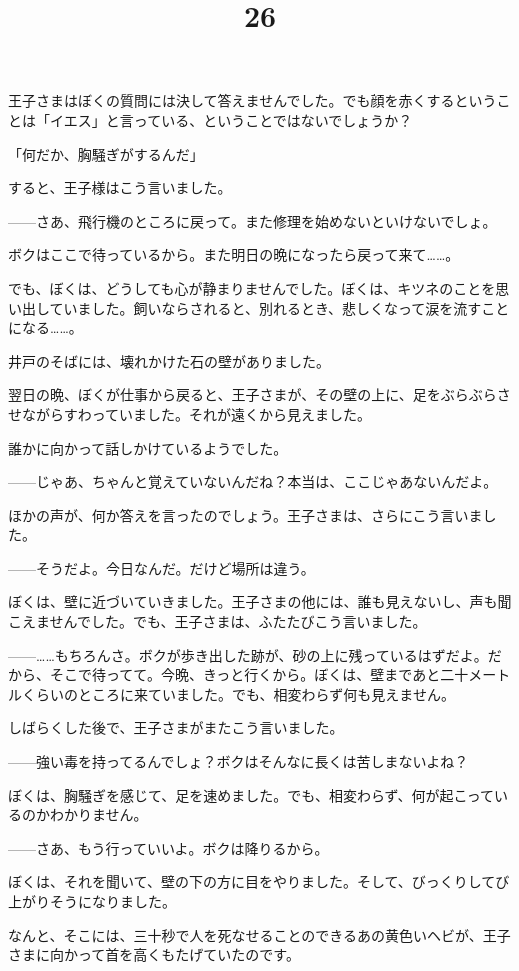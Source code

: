 王子さまはぼくの質問には決して答えませんでした。でも顔を赤くするということは「イエス」と言っている、ということではないでしょうか？

「何だか、胸騒ぎがするんだ」

すると、王子様はこう言いました。

——さあ、飛行機のところに戻って。また修理を始めないといけないでしょ。

ボクはここで待っているから。また明日の晩になったら戻って来て……。

でも、ぼくは、どうしても心が静まりませんでした。ぼくは、キツネのことを思い出していました。飼いならされると、別れるとき、悲しくなって涙を流すことになる……。


\title{26}

井戸のそばには、壊れかけた石の壁がありました。

翌日の晩、ぼくが仕事から戻ると、王子さまが、その壁の上に、足をぶらぶらさせながらすわっていました。それが遠くから見えました。

誰かに向かって話しかけているようでした。

——じゃあ、ちゃんと覚えていないんだね？本当は、ここじゃあないんだよ。

ほかの声が、何か答えを言ったのでしょう。王子さまは、さらにこう言いました。

——そうだよ。今日なんだ。だけど場所は違う。

ぼくは、壁に近づいていきました。王子さまの他には、誰も見えないし、声も聞こえませんでした。でも、王子さまは、ふたたびこう言いました。

——……もちろんさ。ボクが歩き出した跡が、砂の上に残っているはずだよ。だから、そこで待ってて。今晩、きっと行くから。ぼくは、壁まであと二十メートルくらいのところに来ていました。でも、相変わらず何も見えません。

しばらくした後で、王子さまがまたこう言いました。

——強い毒を持ってるんでしょ？ボクはそんなに長くは苦しまないよね？

ぼくは、胸騒ぎを感じて、足を速めました。でも、相変わらず、何が起こっているのかわかりません。

——さあ、もう行っていいよ。ボクは降りるから。

ぼくは、それを聞いて、壁の下の方に目をやりました。そして、びっくりしてび上がりそうになりました。


なんと、そこには、三十秒で人を死なせることのできるあの黄色いヘビが、王子さまに向かって首を高くもたげていたのです。

